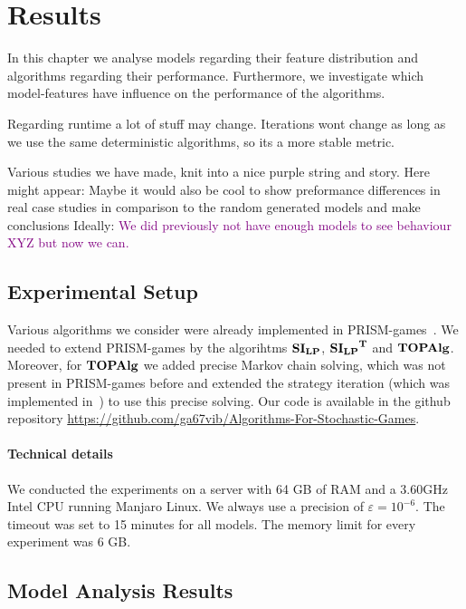 \chapter{Results} \label{ch:results}

In this chapter we analyse models regarding their feature distribution and algorithms regarding their performance.
Furthermore, we investigate which model-features have influence on the performance of the algorithms.

Regarding runtime a lot of stuff may change. Iterations wont change as long as we use the same deterministic algorithms, so its a more stable metric.

Various studies we have made, knit into a nice purple string and story. Here might appear:
Maybe it would also be cool to show preformance differences in real case studies in comparison to the random generated models and make conclusions Ideally:
\textcolor{purple}{We did previously not have enough models to see behaviour XYZ but now we can.}

\section{Experimental Setup}
Various algorithms we consider were already implemented in PRISM-games~\cite{prismgames3}.
We needed to extend PRISM-games by the algorihtms $\mathbf{SI_{LP}}$, $\mathbf{\mathbf{SI_{LP}}^T}$ and $\mathbf{TOPAlg}$.
Moreover, for $\mathbf{TOPAlg}$ we added precise Markov chain solving, which was not present in PRISM-games before and extended the strategy iteration (which was implemented in~\cite{gandalf20}) to use this precise solving.
Our code is available in the github repository \url{https://github.com/ga67vib/Algorithms-For-Stochastic-Games}.

\subsubsection*{Technical details}
We conducted the experiments on a server with 64 GB of RAM and a 3.60GHz Intel CPU running Manjaro Linux. %
We always use a precision of $\varepsilon=10^{-6}$. The timeout was set to 15 minutes for all models. 
The memory limit for every experiment was 6 GB.

\section{Model Analysis Results}

